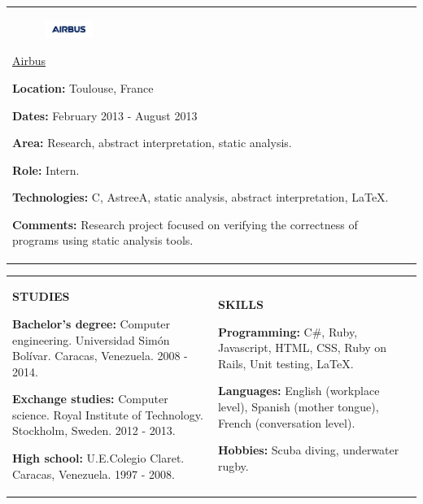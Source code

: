 \documentclass[10pt]{article}
\begin{document}
\begin{tabular}[t]{ll}
	\\

	\parbox{0.45\textwidth}
	{
		\begin{figure}
			\includegraphics[width=0.15\textwidth]{airbus}
		\end{figure}

		\begin{center}
			\underline{\href{http://www.airbus.com/}{Airbus}}
		\end{center}

		\textbf{Location:} Toulouse, France

		\textbf{Dates:} February 2013 - August 2013
	
		\textbf{Area:} Research, abstract interpretation, static analysis.
	
		\textbf{Role:} Intern.
	
		\textbf{Technologies:} C, AstreeA, static analysis, abstract interpretation, \LaTeX.
	
		\textbf{Comments:} Research project focused on verifying the correctness of programs using static analysis tools.
	}
\end{tabular}

\vspace{3mm}

\begin{tabular}{ll}

	\parbox{0.45\textwidth}
	{
		\begin{center}
			\textbf{\uppercase{Studies}}
		\end{center}

		\textbf{Bachelor's degree:} Computer engineering. Universidad Simón Bolívar. Caracas, Venezuela. 2008 - 2014.

		\textbf{Exchange studies:} Computer science. Royal Institute of Technology. Stockholm, Sweden. 2012 - 2013.

		\textbf{High school:} U.E.Colegio Claret. Caracas, Venezuela. 1997 - 2008.
	}

	&

	\parbox{0.45\textwidth}
	{
		\begin{center}
			\textbf{\uppercase{Skills}}
		\end{center}

		\textbf{Programming:} C\#, Ruby, Javascript, HTML, CSS, Ruby on Rails, Unit testing, \LaTeX.

		\textbf{Languages:} English (workplace level), Spanish (mother tongue), French (conversation level).

		\textbf{Hobbies:} Scuba diving, underwater rugby.
	}

\end{tabular}
\end{document}
